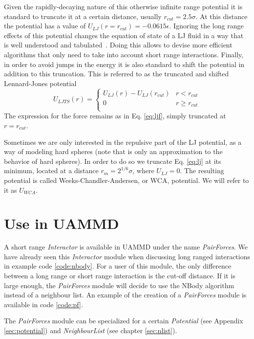 \documentclass[ twoside,openright,titlepage,numbers=noenddot,%
headinclude,footinclude,cleardoublepage=empty,abstract=on,
BCOR=5mm,paper=b5,fontsize=11pt, dvipsnames
]{scrreprt}
\newcommand{\uammd}{\gls{UAMMD}\xspace}
\begin{document}
Given the rapidly-decaying nature of this otherwise infinite range potential it is standard to truncate it at a certain distance, usually $r_{cut} = 2.5\sigma$. At this distance the potential has a value of $U_{LJ}(r = r_{cut}) = -0.0615\epsilon$.
Ignoring the long range effects of this potential changes the equation of state of a \gls{LJ} fluid in a way that is well understood and tabulated~\cite{Thol2015}. Doing this allows to devise more efficient algorithms that only need to take into account short range interactions.
Finally, in order to avoid jumps in the energy it is also standard to shift the potential in addition to this truncation. This is referred to as the truncated and shifted Lennard-Jones potential
\begin{equation}
  \label{eq:ljts}
  U_{LJTS}(r) =
  \begin{cases}
      U_{LJ}(r) - U_{LJ}(r_{cut}) & r<r_{cut}\\
      0 & r\ge r_{cut}\\                                    
    \end{cases}
\end{equation}
The expression for the force remains as in Eq. \eqref{eq:ljf}, simply truncated at $r=r_{cut}$.

Sometimes we are only interested in the repulsive part of the LJ potential, as a way of modeling hard spheres (note that is only an approximation to the behavior of hard spheres). In order to do so we truncate Eq. \eqref{eq:lj} at its minimum, located at a distance $r_m = 2^{1/6}\sigma$, where $U_{LJ} = 0$. The resulting potential is called Weeks-Chandler-Andersen, or WCA, potential. We will refer to it as $U_{WCA}$.

\section*{Use in UAMMD}

A short range \emph{Interactor} is available in \uammd under the name \emph{PairForces}. We have already seen this \emph{Interactor} module when discussing long ranged interactions in example code \ref{code:nbody}. For a user of this module, the only difference between a long range or short range interaction is the cut-off distance. If it is large enough, the \emph{PairForces} module will decide to use the NBody algorithm instead of a neighbour list. An example of the creation of a \emph{PairForces} module is available in code \ref{code:pf}.

The \emph{PairForces} module can be specialized for a certain \emph{Potential} (see Appendix \ref{sec:potential}) and \emph{NeighbourList} (see chapter \ref{sec:nlist}).
\end{document}
